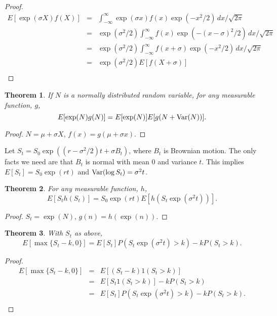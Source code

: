 \documentclass[11pt,fleqn]{amsart}
\newcommand{\Var}{\mathop{\rm{Var}}}
\newtheorem{thm}{Theorem}[section]
\begin{document}
\begin{proof}
\begin{eqnarray*}
E[\exp(\sigma X) f(X)]
	&=& \int_{-\infty}^\infty \exp(\sigma x) f(x) \exp(-x^2/2)\,dx/\sqrt{2\pi}\\
	&=& \exp(\sigma^2/2)
		\int_{-\infty}^\infty f(x)\exp(-(x - \sigma)^2/2)\,dx/\sqrt{2\pi}\\
	&=& \exp(\sigma^2/2)
		\int_{-\infty}^\infty f(x + \sigma)\exp(-x^2/2)\,dx/\sqrt{2\pi}\\
	&=&
		\exp(\sigma^2/2) E[f(X + \sigma)]\\
\end{eqnarray*}
\end{proof}

\begin{thm}
If $N$ is a normally distributed random variable, for any measurable function, $g$,
$$E[\exp(N) g(N)] = E[\exp(N)] E[g(N + \Var(N))].$$
\end{thm}

\begin{proof}
$N = \mu + \sigma X$, $f(x) = g(\mu + \sigma x)$.
\end{proof}

Let $S_t = S_0\exp((r - \sigma^2/2)t + \sigma B_t)$, where $B_t$ is
Brownian motion. The only facts we need are that $B_t$ is normal with
mean 0 and variance $t$. This implies$E[S_t] = S_0\exp(rt)$ and
$\Var(\log S_t) = \sigma^2t$.

\begin{thm}
For any measurable function, $h$,
$$E[S_t h(S_t)] = S_0 \exp(rt) E[h(S_t\exp(\sigma^2t))].$$
\end{thm}
\begin{proof}
$S_t = \exp(N)$, $g(n) = h(\exp(n))$.
\end{proof}

\begin{thm} With $S_t$ as above,
$$E[\max\{S_t - k,0\}] = E[S_t] P(S_t \exp(\sigma^2t) > k) - k P(S_t > k).$$
\end{thm}
\begin{proof}
\begin{eqnarray*}
E[\max\{S_t - k,0\}] &=& E[(S_t - k)1(S_t > k)]\\
	&=& E[S_t 1(S_t > k)] - kP(S_t > k)\\
	&=&  E[S_t] P(S_t \exp(\sigma^2t) > k) - k P(S_t > k).\\
\end{eqnarray*}
\end{proof}
\end{document}

